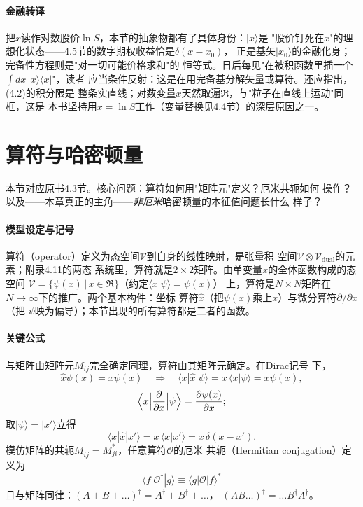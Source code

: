 \paragraph{金融转译}
把$x$读作对数股价$\ln S$，本节的抽象物都有了具体身份：$|x\rangle$是
"股价钉死在$x$"的理想化状态——4.5节的数字期权收益恰是$\delta(x-x_0)$，
正是基矢$|x_0\rangle$的金融化身；完备性方程则是"对一切可能价格求和"的
恒等式。日后每见"在被积函数里插一个$\int dx\,|x\rangle\langle x|$"，读者
应当条件反射：这是在用完备基分解矢量或算符。还应指出，(4.2)的积分限是
整条实直线；对数变量$x$天然取遍$\Re$，与"粒子在直线上运动"同框，这是
本书坚持用$x=\ln S$工作（变量替换见4.4节）的深层原因之一。

\section{算符与哈密顿量}

本节对应原书4.3节。核心问题：算符如何用"矩阵元"定义？厄米共轭如何
操作？以及——本章真正的主角——\emph{非厄米}哈密顿量的本征值问题长什么
样子？

\paragraph{模型设定与记号}
算符（operator）定义为态空间$\mathcal{V}$到自身的线性映射，是张量积
空间$\mathcal{V}\otimes\mathcal{V}_{\mathrm{dual}}$的元素；附录4.11的两态
系统里，算符就是$2\times2$矩阵。由单变量$x$的全体函数构成的态空间
$\mathcal{V}=\{\psi(x)\,|\,x\in\Re\}$（约定$\langle x|\psi\rangle=\psi(x)$）
上，算符是$N\times N$矩阵在$N\to\infty$下的推广。两个基本构件：坐标
算符$\hat{x}$（把$\psi(x)$乘上$x$）与微分算符$\partial/\partial x$（把
$\psi$映为偏导）；本节出现的所有算符都是二者的函数。

\paragraph{关键公式}
与矩阵由矩阵元$M_{ij}$完全确定同理，算符由其矩阵元确定。在Dirac记号
下，
\begin{equation*}
\hat{x}\psi(x)=x\psi(x)
\quad\Longrightarrow\quad
\langle x|\hat{x}|\psi\rangle=x\,\langle x|\psi\rangle=x\psi(x),
\end{equation*}
\begin{equation*}
\Bigl\langle x\Bigl|\frac{\partial}{\partial x}\Bigr|\psi\Bigr\rangle
=\frac{\partial\psi(x)}{\partial x};
\end{equation*}
取$|\psi\rangle=|x'\rangle$立得
\begin{equation*}
\langle x|\hat{x}|x'\rangle=x\,\langle x|x'\rangle=x\,\delta(x-x').
\end{equation*}
模仿矩阵的共轭$M^{\dagger}_{ij}=M^{*}_{ji}$，任意算符$\mathcal{O}$的厄米
共轭（Hermitian conjugation）定义为
\begin{equation*}
\langle f|\mathcal{O}^{\dagger}|g\rangle\equiv
\langle g|\mathcal{O}|f\rangle^{*}
\tag{4.4}
\end{equation*}
且与矩阵同律：$(A+B+\ldots)^{\dagger}=A^{\dagger}+B^{\dagger}+\ldots$，
$(AB\ldots)^{\dagger}=\ldots B^{\dagger}A^{\dagger}$。

